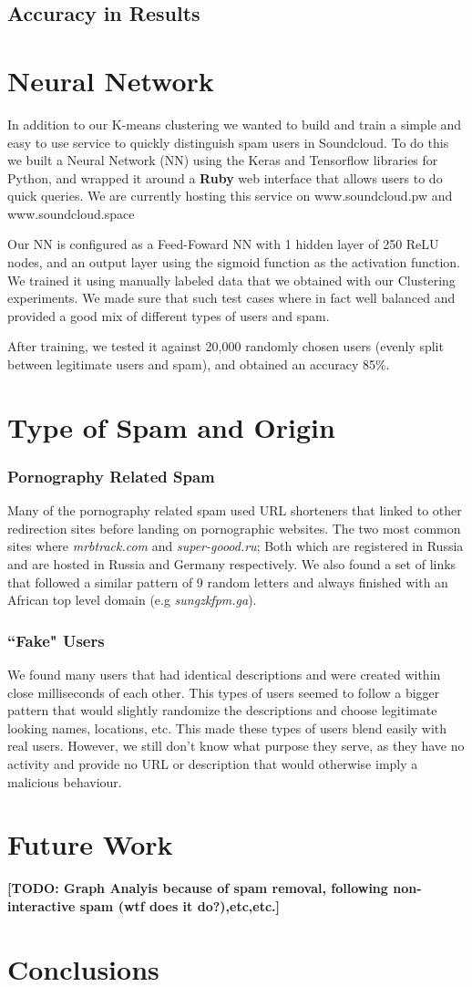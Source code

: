\documentclass[11pt,twocolumn]{article} %
\begin{document}
\subsection{Accuracy in Results}

\section{Neural Network}
In addition to our K-means clustering we wanted to build and train a simple and easy to use service to quickly distinguish spam users in Soundcloud. To do this we built a Neural Network (NN) using the Keras and Tensorflow libraries for Python, and wrapped it around a \textbf{Ruby} web interface that allows users to do quick queries. We are currently hosting this service on www.soundcloud.pw and www.soundcloud.space
\par Our NN is configured as a Feed-Foward NN with 1 hidden layer of 250 ReLU nodes, and an output layer using the sigmoid function as the activation function. We trained it using manually labeled data that we obtained with our Clustering experiments. We made sure that such test cases where in fact well balanced and provided a good mix of different types of users and spam.
\par After training, we tested it against 20,000 randomly chosen users (evenly split between legitimate users and spam), and obtained an accuracy 85\%.


\section{Type of Spam and Origin}
\subsubsection{Pornography Related Spam}
Many of the pornography related spam used URL shorteners that linked to other redirection sites before landing on pornographic websites. The two most common sites where \textit{mrbtrack.com} and \textit{super-goood.ru}; Both which are registered in Russia and are hosted in Russia and Germany respectively. We also found a set of links that followed a similar pattern of 9 random letters and always finished with an African top level domain (e.g \textit{sungzkfpm.ga}).
\subsubsection{``Fake" Users}
We found many users that had identical descriptions and were created within close milliseconds of each other. This types of users seemed to follow a bigger pattern that would slightly randomize the descriptions and choose legitimate looking names, locations, etc. This made these types of users blend easily with real users. However, we still don't know what purpose they serve, as they have no activity and provide no URL or description that would otherwise imply a malicious behaviour.



\section{Future Work}
\textbf{[TODO: Graph Analyis because of spam removal, following non-interactive spam (wtf does it do?),etc,etc.]}

\section{Conclusions}
\end{document}
